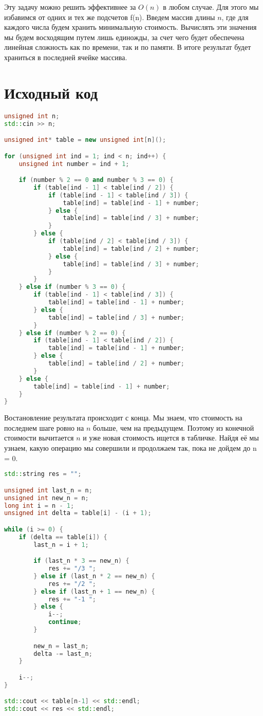 Эту задачу можно решить эффективнее за $O(n)$ в любом случае. Для этого мы избавимся от одних и тех же подсчетов f(n). Введем массив длины $n$, где для каждого числа будем хранить минимальную стоимость. 
Вычислять эти значения мы будем восходящим путем лишь единожды, за счет чего будет обеспечена линейная сложность как по времени, так и по памяти. В итоге результат будет храниться в последней ячейке массива.

\newpage

\section{Исходный код}

\begin{lstlisting}[language=c++]
unsigned int n;
std::cin >> n;

unsigned int* table = new unsigned int[n]();

for (unsigned int ind = 1; ind < n; ind++) {
	unsigned int number = ind + 1;

	if (number % 2 == 0 and number % 3 == 0) {
		if (table[ind - 1] < table[ind / 2]) {
			if (table[ind - 1] < table[ind / 3]) {
				table[ind] = table[ind - 1] + number;
			} else {
				table[ind] = table[ind / 3] + number;
			}
		} else {
			if (table[ind / 2] < table[ind / 3]) {
				table[ind] = table[ind / 2] + number;
			} else {
				table[ind] = table[ind / 3] + number;
			}
		}
	} else if (number % 3 == 0) {
		if (table[ind - 1] < table[ind / 3]) {
			table[ind] = table[ind - 1] + number;
		} else {
			table[ind] = table[ind / 3] + number;
		}
	} else if (number % 2 == 0) {
		if (table[ind - 1] < table[ind / 2]) {
			table[ind] = table[ind - 1] + number;
		} else {
			table[ind] = table[ind / 2] + number;
		}
	} else {
		table[ind] = table[ind - 1] + number;
	}
}
\end{lstlisting}

Востановление результата происходит с конца. Мы знаем, что стоимость на последнем шаге ровно на $n$ больше, чем на предыдущем. Поэтому из конечной стоимости вычитается $n$ и уже новая стоимость ищется в табличке. Найдя её мы узнаем, какую операцию мы совершили и продолжаем так, пока не дойдем до n = 0.

\begin{lstlisting}[language=c++]
std::string res = "";

unsigned int last_n = n;
unsigned int new_n = n;
long int i = n - 1;
unsigned int delta = table[i] - (i + 1);

while (i >= 0) {
	if (delta == table[i]) {
		last_n = i + 1;

		if (last_n * 3 == new_n) {
			res += "/3 ";
		} else if (last_n * 2 == new_n) {
			res += "/2 ";
		} else if (last_n + 1 == new_n) {
			res += "-1 ";
		} else {
			i--;
			continue;
		}

		new_n = last_n;
		delta -= last_n;
	}

	i--;
}

std::cout << table[n-1] << std::endl;
std::cout << res << std::endl;
\end{lstlisting}

